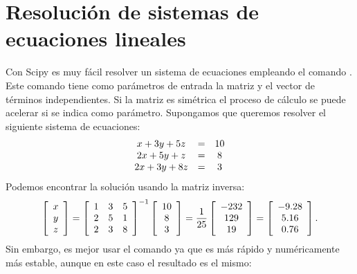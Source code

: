 \documentclass[letterpaper,10pt,spanish]{sphinxmanual}
\begin{document}
\section{Resolución de sistemas de ecuaciones lineales}
\label{calculo_numerico:resolucion-de-sistemas-de-ecuaciones-lineales}
Con Scipy es muy fácil resolver un sistema de ecuaciones empleando el comando . Este comando tiene como parámetros de entrada la matriz y el vector de términos independientes. Si la matriz es simétrica el proceso de cálculo se puede acelerar si se indica como parámetro. Supongamos que queremos resolver el siguiente sistema de ecuaciones:
\begin{gather}
\begin{split}\begin{array}{c c c}
x+3y+5z & = & 10\\
2x+5y+z & = & 8\\
2x+3y+8z & = & 3
\end{array}\end{split}\notag
\end{gather}
Podemos encontrar la solución usando la matriz inversa:
\begin{gather}
\begin{split}\left[\begin{array}{c} x\\ y\\ z\end{array}\right]=\left[\begin{array}{ccc} 1 & 3 & 5\\ 2 & 5 & 1\\ 2 & 3 & 8\end{array}\right]^{-1}\left[\begin{array}{c} 10\\ 8\\ 3\end{array}\right]=\frac{1}{25}\left[\begin{array}{c} -232\\ 129\\ 19\end{array}\right]=\left[\begin{array}{c} -9.28\\ 5.16\\ 0.76\end{array}\right].\end{split}\notag
\end{gather}
Sin embargo, es mejor usar el comando  ya que es más rápido y numéricamente más estable, aunque en este caso el resultado es el mismo:
\end{document}
